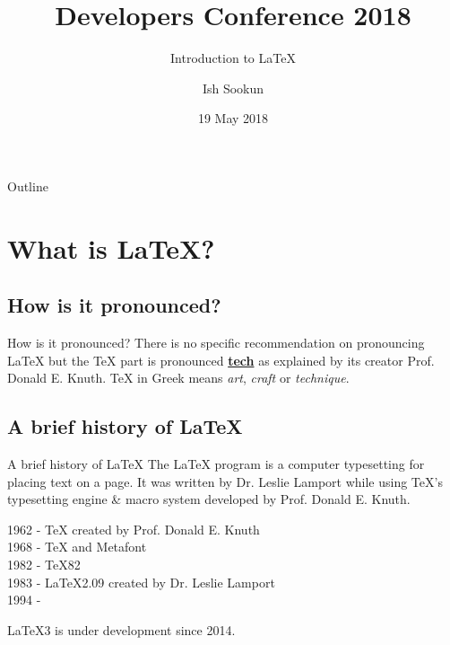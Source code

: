 \documentclass[aspectratio=169]{beamer}
\title{Developers Conference 2018}
\subtitle{Introduction to {\LaTeX}}
\author{Ish Sookun}
\institute[La Sentinelle Ltd] %
{
  Linux System Administrator\\
  La Sentinelle Ltd\\
  LSL Digital \textit{(we develop \& host digital products for La Sentinelle Ltd \& subsidiaries)}\\ 
  \begin{flushright}
    \texttt{[image: logo-lsl.png]}
  \end{flushright}
}
\date{19 May 2018}
\begin{document}
\begin{frame}
  \titlepage
\end{frame}

\begin{frame}{Outline}
  \tableofcontents
\end{frame}

\section{What is {\LaTeX}?}

\subsection{How is it pronounced?}
\begin{frame}{How is it pronounced?}
  There is no specific recommendation on pronouncing {\LaTeX} but the {\TeX} part is pronounced \underline{\bf tech} as explained by its creator Prof. Donald E. Knuth. {\TeX} in Greek means \textit{art}, \textit{craft} or \textit{technique}.

\end{frame}

\subsection{A brief history of {\LaTeX}}
\begin{frame}{A brief history of {\LaTeX}}
  The {\LaTeX} program is a computer typesetting for placing text on a page. It was written by Dr. Leslie Lamport while using {\TeX}'s typesetting engine \& macro system developed by Prof. Donald E. Knuth.

  \hspace{4ex}1962 - {\TeX} created by Prof. Donald E. Knuth\\
  \hspace{4ex}1968 - {\TeX} and Metafont\\
  \hspace{4ex}1982 - {\TeX}82\\
  \hspace{4ex}1983 - {\LaTeX}2.09 created by Dr. Leslie Lamport\\
  \hspace{4ex}1994 - {\LaTeXe}

  {\LaTeX}3 is under development since 2014.
\end{frame}
\end{document}
